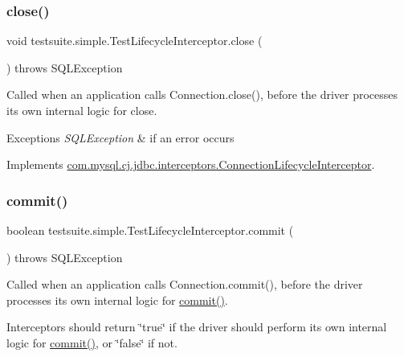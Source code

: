 \subsubsection{\texorpdfstring{close()}{close()}}
{\footnotesize\ttfamily void testsuite.\+simple.\+Test\+Lifecycle\+Interceptor.\+close (\begin{DoxyParamCaption}{ }\end{DoxyParamCaption}) throws S\+Q\+L\+Exception}

Called when an application calls Connection.\+close(), before the driver processes its own internal logic for close.


\begin{DoxyExceptions}{Exceptions}
{\em S\+Q\+L\+Exception} & if an error occurs \\
\hline
\end{DoxyExceptions}


Implements \mbox{\hyperlink{interfacecom_1_1mysql_1_1cj_1_1jdbc_1_1interceptors_1_1_connection_lifecycle_interceptor_abb75c2ea1017850c63b6783a657cec4c}{com.\+mysql.\+cj.\+jdbc.\+interceptors.\+Connection\+Lifecycle\+Interceptor}}.

\mbox{\label{classtestsuite_1_1simple_1_1_test_lifecycle_interceptor_a1c51358948a855403a8953f3d4ba5590}} 
\subsubsection{\texorpdfstring{commit()}{commit()}}
{\footnotesize\ttfamily boolean testsuite.\+simple.\+Test\+Lifecycle\+Interceptor.\+commit (\begin{DoxyParamCaption}{ }\end{DoxyParamCaption}) throws S\+Q\+L\+Exception}

Called when an application calls Connection.\+commit(), before the driver processes its own internal logic for \mbox{\hyperlink{classtestsuite_1_1simple_1_1_test_lifecycle_interceptor_a1c51358948a855403a8953f3d4ba5590}{commit()}}.

Interceptors should return \char`\"{}true\char`\"{} if the driver should perform its own internal logic for \mbox{\hyperlink{classtestsuite_1_1simple_1_1_test_lifecycle_interceptor_a1c51358948a855403a8953f3d4ba5590}{commit()}}, or \char`\"{}false\char`\"{} if not.

